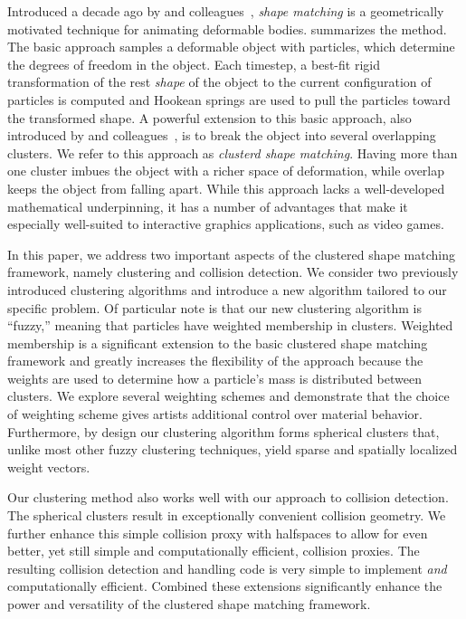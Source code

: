 \documentclass[review]{acmsiggraph}
\begin{document}
Introduced a decade ago by \Mueller and
colleagues~, 
{\em shape matching} is a
geometrically motivated technique for animating deformable bodies.
 summarizes the method.
The basic approach samples a deformable object with particles, which
determine the degrees of freedom in the object.  Each timestep, a best-fit
rigid transformation of the rest {\em shape} of the object to the 
current configuration of particles is computed and Hookean springs
are used to pull the particles toward the transformed shape.
A powerful extension to this basic approach, also introduced by 
\Mueller and colleagues~, is to break the
object into several overlapping clusters.  We refer to this approach as
{\em clusterd shape matching}.  Having more than one cluster imbues
the object with a richer space of deformation, while overlap keeps
the object from falling apart.
While this approach lacks a well-developed mathematical
underpinning, it has a number of advantages that make it especially
well-suited to interactive graphics applications, such as video games.

In this paper, we address two important aspects of the clustered shape matching framework, namely clustering
and collision detection.
We consider two previously introduced clustering algorithms and introduce a new algorithm tailored to our
specific problem.
Of particular note is that our new clustering algorithm is ``fuzzy,'' 
meaning that particles have weighted membership in clusters.
Weighted membership is a significant extension to the basic clustered shape matching framework and greatly
increases the flexibility of the approach because the weights are used to determine how a particle's
mass is distributed between clusters.
We explore several weighting schemes and demonstrate that the choice of weighting scheme gives 
artists additional control over material behavior.
Furthermore, by design our clustering algorithm forms spherical clusters that, unlike most other fuzzy clustering
techniques, yield sparse and spatially localized weight vectors.

Our clustering method also works well with our approach to collision detection.  The spherical clusters
result in exceptionally convenient collision geometry.  We further 
enhance this simple collision proxy with halfspaces to allow for even better, yet still simple and computationally efficient, 
collision proxies.  The resulting collision detection and handling code is very simple to implement {\em and} computationally efficient.
Combined these extensions significantly enhance the power and versatility of the clustered shape matching framework.
\end{document}
